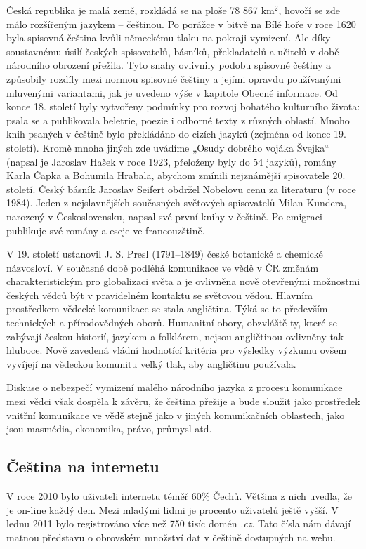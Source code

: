 \begin{multicols}{2}
Česká republika je malá země, rozkládá se na ploše 78 867 km$^{\textrm{2}}$, hovoří se zde málo rozšířeným jazykem – češtinou. Po porážce v bitvě na Bílé hoře v roce 1620 byla spisovná čeština kvůli německému tlaku na pokraji vymizení. Ale díky soustavnému úsilí českých spisovatelů, básníků, překladatelů a učitelů v době národního obrození přežila. Tyto snahy ovlivnily podobu spisovné češtiny a způsobily rozdíly mezi normou spisovné češtiny a jejími opravdu používanými mluvenými variantami, jak je uvedeno výše v kapitole Obecné informace. Od konce 18. století byly vytvořeny podmínky pro rozvoj bohatého kulturního života: psala se a publikovala beletrie, poezie i odborné texty z různých oblastí. Mnoho knih psaných v češtině bylo překládáno do cizích jazyků (zejména od konce 19. století). Kromě mnoha jiných zde uvádíme „Osudy dobrého vojáka Švejka“ (napsal je Jaroslav Hašek v roce 1923, přeloženy byly do 54 jazyků), romány Karla Čapka a Bohumila Hrabala, abychom zmínili nejznámější spisovatele 20. století. Český básník Jaroslav Seifert obdržel Nobelovu cenu za literaturu (v roce 1984). Jeden z nejslavnějších současných světových spisovatelů Milan Kundera, narozený v Československu, napsal své první knihy v češtině. Po emigraci publikuje své romány a eseje ve francouzštině.

V 19. století ustanovil J. S. Presl (1791–1849) české botanické a chemické názvosloví. V současné době podléhá komunikace ve vědě v ČR změnám charakteristickým pro globalizaci světa a je ovlivněna nově otevřenými možnostmi českých vědců být v pravidelném kontaktu se světovou vědou. Hlavním prostředkem vědecké komunikace se stala angličtina. Týká se to především technických a přírodovědných oborů. Humanitní obory, obzvláště ty, které se zabývají českou historií, jazykem a folklórem, nejsou angličtinou ovlivněny tak hluboce. Nově zavedená vládní hodnotící kritéria pro výsledky výzkumu ovšem vyvíjejí na vědeckou komunitu velký tlak, aby angličtinu používala.

Diskuse o nebezpečí vymizení malého národního jazyka z procesu komunikace mezi vědci však dospěla k závěru, že čeština přežije a bude sloužit jako prostředek vnitřní komunikace ve vědě stejně jako v jiných komunikačních oblastech, jako jsou masmédia, ekonomika, právo, průmysl atd.

\subsection{Čeština na internetu}

V roce 2010 bylo uživateli internetu téměř 60\% Čechů. Většina z nich uvedla, že je on-line každý den. Mezi mladými lidmi je procento uživatelů ještě vyšší. V lednu 2011 bylo registrováno více než 750 tisíc domén \emph{.cz}. Tato čísla nám dávají matnou představu o obrovském množství dat v češtině dostupných na webu.


\end{multicols}
